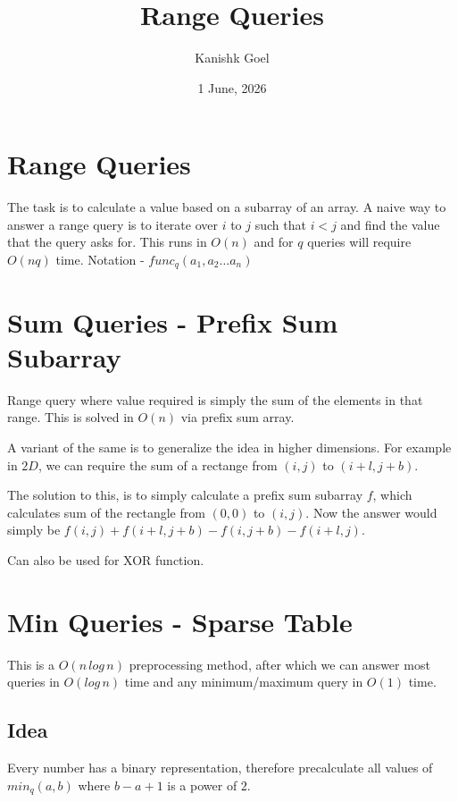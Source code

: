 \documentclass{article}
\title{Range Queries}
\author{Kanishk Goel}
\date{1 June, 2026}
\begin{document}
	\SetAlgoCaptionSeparator{}
	\renewcommand{\thealgocf}{} 
	\renewcommand{\AlCapNameFnt}{\bfseries}
	\renewcommand{\AlCapFnt}{}
	\DontPrintSemicolon
	\renewcommand{\algorithmcfname}{}
	\maketitle
	\SetAlgoNoEnd
	
	\section{Range Queries}
	The task is to calculate a value based on a subarray of an array. A naive way to answer a range query is to iterate over $i$ to $j$ such that $i < j$ and find the value that the query asks for. This runs in $O(n)$ and for $q$ queries will require $O(nq)$ time. Notation - $func_q(a_1,a_2 \ldots a_n)$
	
	\section{Sum Queries - Prefix Sum Subarray}
	Range query where value required is simply the sum of the elements in that range. This is solved in $O(n)$ via prefix sum array. \newline
	
	A variant of the same is to generalize the idea in higher dimensions. For example in $2D$, we can require the sum of a rectange from $(i,j)$ to $(i+l,j+b)$. \newline
	
	The solution to this, is to simply calculate a prefix sum subarray $f$, which calculates sum of the rectangle from $(0,0)$ to $(i,j)$. Now the answer would simply be $f(i,j) + f(i+l,j+b) - f(i,j+b) - f(i+l,j)$. \newline
	
	Can also be used for XOR function.
	
	\section{Min Queries - Sparse Table}
	This is a $O(n \, log \, n)$ preprocessing method, after which we can answer most queries in $O(log \, n)$ time and any minimum/maximum query in $O(1)$ time. \newline
	
	\subsection{Idea}
	Every number has a binary representation, therefore precalculate all values of $min_q(a,b)$ where $b-a+1$ is a power of $2$. \newline
	
\end{document}
